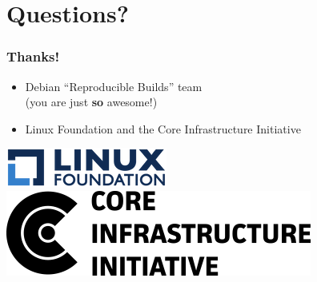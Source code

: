 \documentclass[14pt]{beamer}
\begin{document}
\section{Questions?}

\begin{frame}
 \frametitle{Thanks!}

 \begin{itemize}
  \item Debian “Reproducible Builds” team \\
        {\small (you are just \textbf{so} awesome!)}
  \item Linux Foundation and the Core Infrastructure Initiative
 \end{itemize}

 \begin{center}
  \includegraphics[height=0.1\paperheight]{images/linux_foundation_logo.png}
  \hspace{0.1\paperwidth}
  \includegraphics[height=0.1\paperheight]{images/cii_logo.png}
 \end{center}

 \vfill
 \begin{center}
 \end{center}
\end{frame}
\end{document}
